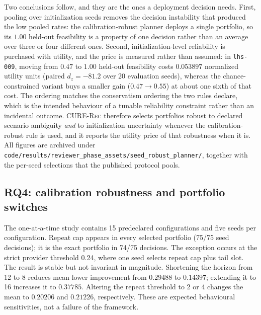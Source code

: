\documentclass[review]{elsarticle}
\theoremstyle{plain}
\theoremstyle{definition}
\theoremstyle{remark}
\newcommand{\CURE}{\textsc{CURE-Rec}}
\begin{document}
Two conclusions follow, and they are the ones a deployment decision needs. First, pooling over initialization seeds removes the decision instability that produced the low pooled rates: the calibration-robust planner deploys a single portfolio, so its $1.00$ held-out feasibility is a property of one decision rather than an average over three or four different ones. Second, initialization-level reliability is purchased with utility, and the price is measured rather than assumed: in \texttt{lhs-009}, moving from $0.47$ to $1.00$ held-out feasibility costs $0.053897$ normalized utility units (paired $d_z=-81.2$ over 20 evaluation seeds), whereas the chance-constrained variant buys a smaller gain ($0.47\rightarrow0.55$) at about one sixth of that cost. The ordering matches the conservatism ordering the two rules declare, which is the intended behaviour of a tunable reliability constraint rather than an incidental outcome. \CURE{} therefore selects portfolios robust to declared scenario ambiguity \emph{and} to initialization uncertainty whenever the calibration-robust rule is used, and it reports the utility price of that robustness when it is. All figures are archived under \texttt{code/results/reviewer\_phase\_assets/seed\_robust\_planner/}, together with the per-seed selections that the published protocol pools.

\subsection{RQ4: calibration robustness and portfolio switches}\label{sec:rq3}

The one-at-a-time study contains 15 predeclared configurations and five seeds per configuration. Repeat cap appears in every selected portfolio (75/75 seed decisions); it is the exact portfolio in 74/75 decisions. The exception occurs at the strict provider threshold 0.24, where one seed selects repeat cap plus tail slot. The result is stable but not invariant in magnitude. Shortening the horizon from 12 to 8 reduces mean lower improvement from $0.29488$ to $0.14397$; extending it to 16 increases it to $0.37785$. Altering the repeat threshold to 2 or 4 changes the mean to $0.20206$ and $0.21226$, respectively. These are expected behavioural sensitivities, not a failure of the framework.
\end{document}
